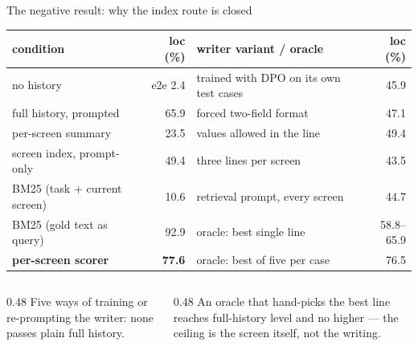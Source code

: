 \documentclass[aspectratio=169,10pt]{beamer}
\newcommand{\gr}[1]{{\color{ncgray}#1}}
\begin{document}
\begin{frame}{The negative result: why the index route is closed}
\vspace{0.3cm}
\centering\scriptsize
\begin{tabular}{lr@{\hskip 2.2em}lr}
\toprule
condition & loc (\%) & writer variant / oracle & loc (\%)\\
\midrule
no history & \gr{e2e 2.4} & trained with DPO \gr{on its own test cases} & 45.9\\
full history, prompted & 65.9 & forced two-field format & 47.1\\
per-screen summary & 23.5 & values allowed in the line & 49.4\\
screen index, prompt-only & 49.4 & three lines per screen & 43.5\\
BM25 \gr{(task + current screen)} & 10.6 & retrieval prompt, every screen & 44.7\\
BM25 \gr{(gold text as query)} & 92.9 & \gr{oracle: best single line} & \gr{58.8--65.9}\\
\textbf{per-screen scorer} & \textbf{77.6} & \gr{oracle: best of five per case} & \gr{76.5}\\
\bottomrule
\end{tabular}
\vspace{0.75cm}
\begin{columns}[T]
\begin{column}{0.48\textwidth}
\footnotesize Five ways of training or re-prompting the writer: none passes plain full history.
\end{column}
\begin{column}{0.48\textwidth}
\footnotesize An oracle that hand-picks the best line reaches full-history level and \alert{no higher} --- the ceiling is the screen itself, not the writing.
\end{column}
\end{columns}
\end{frame}
\end{document}
